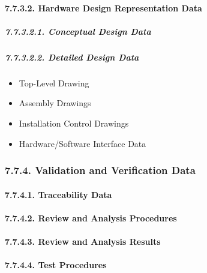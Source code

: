 \documentclass[
]{article}
\providecommand{\tightlist}{%
  \setlength{\itemsep}{0pt}\setlength{\parskip}{0pt}}
\begin{document}
\hypertarget{hardware-design-representation-data-1}{%
\paragraph{7.7.3.2. Hardware Design Representation
Data}\label{hardware-design-representation-data-1}}

\hypertarget{conceptual-design-data-1}{%
\subparagraph{7.7.3.2.1. Conceptual Design
Data}\label{conceptual-design-data-1}}

\hypertarget{detailed-design-data-1}{%
\subparagraph{7.7.3.2.2. Detailed Design
Data}\label{detailed-design-data-1}}

\begin{itemize}
\tightlist
\item
  Top-Level Drawing
\item
  Assembly Drawings
\item
  Installation Control Drawings
\item
  Hardware/Software Interface Data
\end{itemize}

\hypertarget{validation-and-verification-data-1}{%
\subsubsection{7.7.4. Validation and Verification
Data}\label{validation-and-verification-data-1}}

\hypertarget{traceability-data-1}{%
\paragraph{7.7.4.1. Traceability Data}\label{traceability-data-1}}

\hypertarget{review-and-analysis-procedures-1}{%
\paragraph{7.7.4.2. Review and Analysis
Procedures}\label{review-and-analysis-procedures-1}}

\hypertarget{review-and-analysis-results-1}{%
\paragraph{7.7.4.3. Review and Analysis
Results}\label{review-and-analysis-results-1}}

\hypertarget{test-procedures-1}{%
\paragraph{7.7.4.4. Test Procedures}\label{test-procedures-1}}
\end{document}
